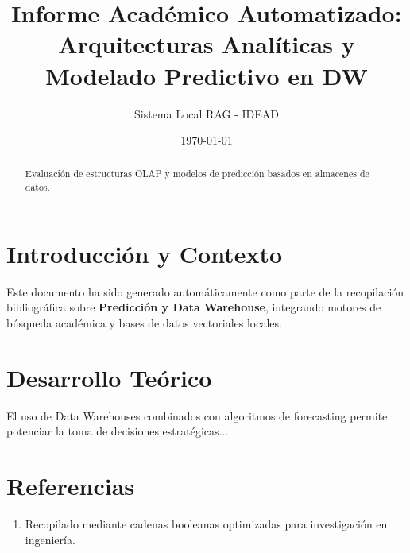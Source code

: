 \documentclass[12pt,a4paper]{article}
\title{\textbf{Informe Académico Automatizado: Arquitecturas Analíticas y Modelado Predictivo en DW}}
\author{Sistema Local RAG - IDEAD}
\date{\today}
\begin{document}
\maketitle

\begin{abstract}
Evaluación de estructuras OLAP y modelos de predicción basados en almacenes de datos.
\end{abstract}

\section{Introducción y Contexto}
Este documento ha sido generado automáticamente como parte de la recopilación bibliográfica sobre \textbf{Predicción y Data Warehouse}, integrando motores de búsqueda académica y bases de datos vectoriales locales.

\section{Desarrollo Teórico}
El uso de Data Warehouses combinados con algoritmos de forecasting permite potenciar la toma de decisiones estratégicas...

\section{Referencias}
\begin{enumerate}
    \item Recopilado mediante cadenas booleanas optimizadas para investigación en ingeniería.
\end{enumerate}
\end{document}
